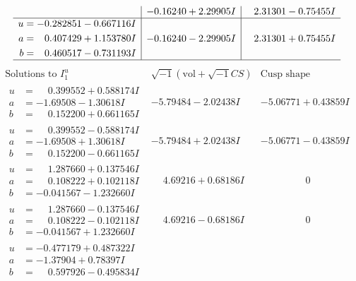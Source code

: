 \documentclass[1p]{elsarticle_modified}
\theoremstyle{definition}
\newcommand{\I}{\sqrt{-1}}
\begin{document}
$$\begin{array}{c|c|c}
 & -0.16240 + 2.29905 I & \phantom{-}2.31301 - 0.75455 I \\ \hline\begin{aligned}
u &= -0.282851 - 0.667116 I \\
a &= \phantom{-}0.407429 + 1.153780 I \\
b &= \phantom{-}0.460517 - 0.731193 I\end{aligned}
 & -0.16240 - 2.29905 I & \phantom{-}2.31301 + 0.75455 I\\
 \hline 
 \end{array}$$\newpage$$\begin{array}{c|c|c}  
\text{Solutions to }I^u_{1}& \I (\text{vol} + \sqrt{-1}CS) & \text{Cusp shape}\\
 \hline 
\begin{aligned}
u &= \phantom{-}0.399552 + 0.588174 I \\
a &= -1.69508 - 1.30618 I \\
b &= \phantom{-}0.152200 + 0.661165 I\end{aligned}
 & -5.79484 - 2.02438 I & -5.06771 + 0.43859 I \\ \hline\begin{aligned}
u &= \phantom{-}0.399552 - 0.588174 I \\
a &= -1.69508 + 1.30618 I \\
b &= \phantom{-}0.152200 - 0.661165 I\end{aligned}
 & -5.79484 + 2.02438 I & -5.06771 - 0.43859 I \\ \hline\begin{aligned}
u &= \phantom{-}1.287660 + 0.137546 I \\
a &= \phantom{-}0.108222 + 0.102118 I \\
b &= -0.041567 - 1.232660 I\end{aligned}
 & \phantom{-}4.69216 + 0.68186 I & \phantom{-0.000000 } 0 \\ \hline\begin{aligned}
u &= \phantom{-}1.287660 - 0.137546 I \\
a &= \phantom{-}0.108222 - 0.102118 I \\
b &= -0.041567 + 1.232660 I\end{aligned}
 & \phantom{-}4.69216 - 0.68186 I & \phantom{-0.000000 } 0 \\ \hline\begin{aligned}
u &= -0.477179 + 0.487322 I \\
a &= -1.37904 + 0.78397 I \\
b &= \phantom{-}0.597926 - 0.495834 I\end{aligned}

\end{array}$$
\end{document}

